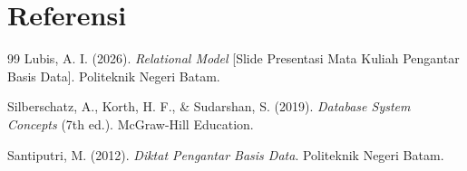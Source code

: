 \documentclass[11pt,a4paper]{article}
\begin{document}
\newpage
\section*{Referensi}

\begin{thebibliography}{99}
	Lubis, A. I. (2026). \textit{Relational Model} [Slide Presentasi Mata Kuliah Pengantar Basis Data]. Politeknik Negeri Batam.

	Silberschatz, A., Korth, H. F., \& Sudarshan, S. (2019). \textit{Database System Concepts} (7th ed.). McGraw-Hill Education.

	Santiputri, M. (2012). \textit{Diktat Pengantar Basis Data}. Politeknik Negeri Batam.
\end{thebibliography}
\end{document}
